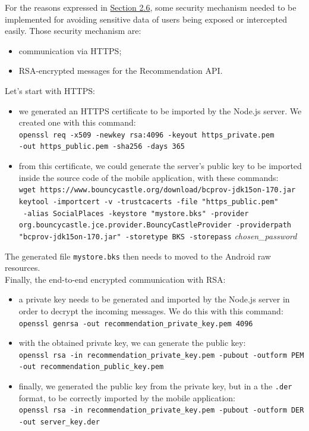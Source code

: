 \documentclass[../../main]{subfiles}
\begin{document}
For the reasons expressed in \hyperref[ss:security-in-communication]{Section 2.6}, some security mechanism needed to be implemented for avoiding sensitive data of users being exposed or intercepted easily.
Those security mechanism are:
\begin{itemize}
    \item communication via HTTPS;
    \item RSA-encrypted messages for the Recommendation API.
\end{itemize}
\noindent
Let's start with HTTPS:
\begin{itemize}
    \item we generated an HTTPS certificate to be imported by the Node.js server. We created one with this command:\\
    \texttt{openssl req -x509 -newkey rsa:4096 -keyout https\_private.pem}\\
    \texttt{-out https\_public.pem -sha256 -days 365}
    \item from this certificate, we could generate the server's public key to be imported inside the source code of the mobile application, with these commands:\\
    \texttt{wget https://www.bouncycastle.org/download/bcprov-jdk15on-170.jar}\\
    \texttt{keytool -importcert -v -trustcacerts -file "https\_public.pem"}\\
    \texttt{ -alias SocialPlaces -keystore "mystore.bks" -provider}\\
    \texttt{org.bouncycastle.jce.provider.BouncyCastleProvider -providerpath}\\
    \texttt{"bcprov-jdk15on-170.jar" -storetype BKS -storepass} \textit{chosen\_password}
\end{itemize}
The generated file \texttt{mystore.bks} then needs to moved to the Android raw resources.\\
\noindent
Finally, the end-to-end encrypted communication with RSA:
\begin{itemize}
    \item a private key needs to be generated and imported by the Node.js server in order to decrypt the incoming messages. We do this with this command:\\
    \texttt{openssl genrsa -out recommendation\_private\_key.pem 4096}
    \item with the obtained private key, we can generate the public key:\\
    \texttt{openssl rsa -in recommendation\_private\_key.pem -pubout -outform PEM}\\
    \texttt{-out recommendation\_public\_key.pem}
    \item finally, we generated the public key from the private key, but in a the \texttt{.der} format, to be correctly imported by the mobile application:\\
    \texttt{openssl rsa -in recommendation\_private\_key.pem -pubout -outform DER}\\
    \texttt{-out server\_key.der}
\end{itemize}
\end{document}
